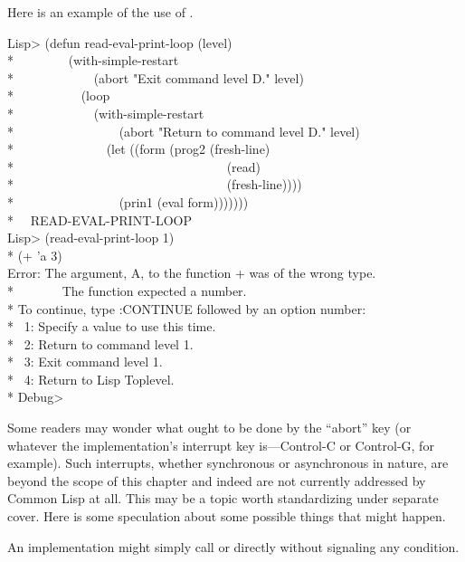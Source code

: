 \begin{defmac}
Here is an example of the use of .
\begin{lisp}
Lisp> (defun read-eval-print-loop (level) \\*
~~~~~~~~(with-simple-restart \\*
~~~~~~~~~~~~(abort "Exit command level {\Xtilde}D." level) \\*
~~~~~~~~~~(loop \\*
~~~~~~~~~~~~(with-simple-restart \\*
~~~~~~~~~~~~~~~~(abort "Return to command level {\Xtilde}D." level) \\*
~~~~~~~~~~~~~~(let ((form (prog2 (fresh-line) \\*
~~~~~~~~~~~~~~~~~~~~~~~~~~~~~~~~~(read) \\*
~~~~~~~~~~~~~~~~~~~~~~~~~~~~~~~~~(fresh-line)))) \\*
~~~~~~~~~~~~~~~~(prin1 (eval form))))))) \\*
~\EV\ READ-EVAL-PRINT-LOOP \\
Lisp> (read-eval-print-loop 1) \\*
(+ 'a 3) \\
Error: The argument, A, to the function + was of the wrong type. \\*
~~~~~~~The function expected a number. \\*
To continue, type :CONTINUE followed by an option number: \\*
~1: Specify a value to use this time. \\*
~2: Return to command level 1. \\*
~3: Exit command level 1. \\*
~4: Return to Lisp Toplevel. \\*
Debug> 
\end{lisp}

\beforenoterule
\begin{sideremark}
Some readers may wonder what ought to be done by the ``abort'' key (or whatever
the implementation's interrupt key is---Control-C or Control-G, for
example). Such interrupts, whether synchronous or asynchronous in nature, are
beyond the scope of this chapter and indeed are not currently addressed by
Common Lisp at all. This may be a topic worth standardizing under separate
cover. Here is some speculation about some possible things that might happen.

An implementation might simply call  or  directly without
signaling any condition.


\end{sideremark}
\end{defmac}
